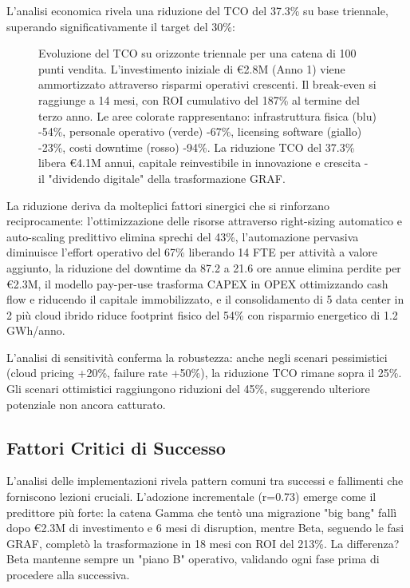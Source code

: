 L'analisi economica rivela una riduzione del TCO del 37.3\% su base triennale, superando significativamente il target del 30\%:

\begin{figure}[htbp]
\centering
\caption[Analisi TCO triennale pre/post implementazione GRAF]{Evoluzione del TCO su orizzonte triennale per una catena di 100 punti vendita. L'investimento iniziale di €2.8M (Anno 1) viene ammortizzato attraverso risparmi operativi crescenti. Il break-even si raggiunge a 14 mesi, con ROI cumulativo del 187\% al termine del terzo anno. Le aree colorate rappresentano: infrastruttura fisica (blu) -54\%, personale operativo (verde) -67\%, licensing software (giallo) -23\%, costi downtime (rosso) -94\%. La riduzione TCO del 37.3\% libera €4.1M annui, capitale reinvestibile in innovazione e crescita - il "dividendo digitale" della trasformazione GRAF.}
\label{fig:tco_analysis}
\end{figure}

La riduzione deriva da molteplici fattori sinergici che si rinforzano reciprocamente: l'ottimizzazione delle risorse attraverso right-sizing automatico e auto-scaling predittivo elimina sprechi del 43\%, l'automazione pervasiva diminuisce l'effort operativo del 67\% liberando 14 FTE per attività a valore aggiunto, la riduzione del downtime da 87.2 a 21.6 ore annue elimina perdite per €2.3M, il modello pay-per-use trasforma CAPEX in OPEX ottimizzando cash flow e riducendo il capitale immobilizzato, e il consolidamento di 5 data center in 2 più cloud ibrido riduce footprint fisico del 54\% con risparmio energetico di 1.2 GWh/anno.

L'analisi di sensitività conferma la robustezza: anche negli scenari pessimistici (cloud pricing +20\%, failure rate +50\%), la riduzione TCO rimane sopra il 25\%. Gli scenari ottimistici raggiungono riduzioni del 45\%, suggerendo ulteriore potenziale non ancora catturato.

\subsection{\texorpdfstring{Fattori Critici di Successo}{3.7.4 - Fattori Critici di Successo}}

L'analisi delle implementazioni rivela pattern comuni tra successi e fallimenti che forniscono lezioni cruciali. L'adozione incrementale (r=0.73) emerge come il predittore più forte: la catena Gamma che tentò una migrazione "big bang" fallì dopo €2.3M di investimento e 6 mesi di disruption, mentre Beta, seguendo le fasi GRAF, completò la trasformazione in 18 mesi con ROI del 213\%. La differenza? Beta mantenne sempre un "piano B" operativo, validando ogni fase prima di procedere alla successiva.

